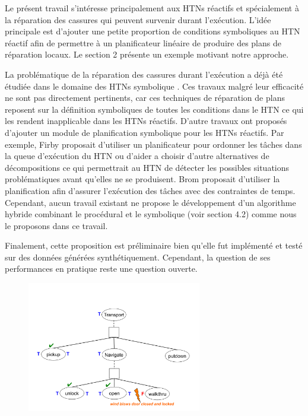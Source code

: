 \documentclass[a4paper,twoside,french]{article}
\begin{document}
				\par Le présent travail s'intéresse principalement aux HTNs réactifs et spécialement à la réparation des cassures qui peuvent survenir durant l'exécution. L'idée principale est d'ajouter une petite proportion de conditions symboliques au HTN réactif  afin de permettre à un planificateur linéaire de produire des plans de réparation locaux. Le section 2 présente un exemple motivant notre approche. 
				\par La problématique de la réparation des cassures durant l'exécution a déjà été étudiée dans le domaine des HTNs symbolique \cite{boella2002replanning,van2005plan,ayan2007hotride,warfield2007adaptation}. Ces travaux malgré leur efficacité ne sont pas directement pertinents,  car ces techniques de réparation de plans reposent sur la définition symboliques de toutes les conditions dans le HTN ce qui les rendent inapplicable dans les HTNs réactifs.  D'autre travaux ont proposés d'ajouter un module de planification symbolique pour les HTNs réactifs. Par exemple, Firby \cite{firby1987investigation} proposait d'utiliser un planificateur pour ordonner les tâches dans la queue d'exécution du HTN ou d'aider a choisir d'autre alternatives de décompositions ce qui permettrait au HTN de  détecter les possibles situations problématiques avant qu'elles ne se produisent. Brom \cite{brom2005hierarchical} proposait d'utiliser la planification afin d'assurer l'exécution des tâches avec des contraintes de temps. Cependant, aucun travail existant ne propose le développement d'un  algorithme hybride combinant le procédural et le symbolique (voir section 4.2) comme nous le proposons dans ce travail.  
				\par Finalement, cette proposition est préliminaire bien qu'elle fut implémenté et testé sur des données générées synthétiquement. Cependant, la question de ses performances en pratique reste une question ouverte. 
				\begin{figure}[t]
					\centerline{\includegraphics[width=3in]{figs/wind}}
					\vskip 8pt
				\end{figure}
	
\end{document}
